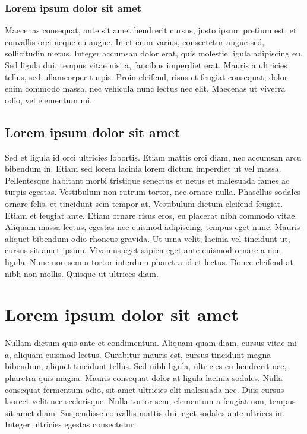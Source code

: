 \subsubsection{Lorem ipsum dolor sit amet}\label{sec:LABEL_CHP_1_SEC_D}
Maecenas consequat, ante sit amet hendrerit cursus, justo ipsum pretium est, et convallis orci neque eu augue. In et enim varius, consectetur augue sed, sollicitudin metus. Integer accumsan dolor erat, quis molestie ligula adipiscing eu. Sed ligula dui, tempus vitae nisi a, faucibus imperdiet erat. Mauris a ultricies tellus, sed ullamcorper turpis. Proin eleifend, risus et feugiat consequat, dolor enim commodo massa, nec vehicula nunc lectus nec elit. Maecenas ut viverra odio, vel elementum mi.

\subsection{Lorem ipsum dolor sit amet}\label{sec:LABEL_CHP_1_SEC_E}
Sed et ligula id orci ultricies lobortis. Etiam mattis orci diam, nec accumsan arcu bibendum in. Etiam sed lorem lacinia lorem dictum imperdiet ut vel massa. Pellentesque habitant morbi tristique senectus et netus et malesuada fames ac turpis egestas. Vestibulum non rutrum tortor, nec ornare nulla. Phasellus sodales ornare felis, et tincidunt sem tempor at. Vestibulum dictum eleifend feugiat. Etiam et feugiat ante. Etiam ornare risus eros, eu placerat nibh commodo vitae. Aliquam massa lectus, egestas nec euismod adipiscing, tempus eget nunc. Mauris aliquet bibendum odio rhoncus gravida. Ut urna velit, lacinia vel tincidunt ut, cursus sit amet ipsum. Vivamus eget sapien eget ante euismod ornare a non ligula. Nunc non sem a tortor interdum pharetra id et lectus. Donec eleifend at nibh non mollis. Quisque ut ultrices diam.

\section{Lorem ipsum dolor sit amet}\label{sec:LABEL_CHP_1_SEC_F}
Nullam dictum quis ante et condimentum. Aliquam quam diam, cursus vitae mi a, aliquam euismod lectus. Curabitur mauris est, cursus tincidunt magna bibendum, aliquet tincidunt tellus. Sed nibh ligula, ultricies eu hendrerit nec, pharetra quis magna. Mauris consequat dolor at ligula lacinia sodales. Nulla consequat fermentum odio, sit amet ultricies elit malesuada nec. Duis cursus laoreet velit nec scelerisque. Nulla tortor sem, elementum a feugiat non, tempus sit amet diam. Suspendisse convallis mattis dui, eget sodales ante ultrices in. Integer ultricies egestas consectetur.

